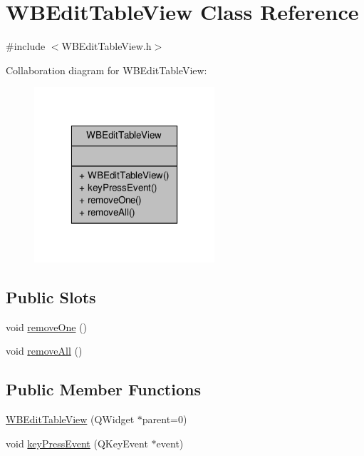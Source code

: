 \hypertarget{class_w_b_edit_table_view}{\section{W\-B\-Edit\-Table\-View Class Reference}
\label{d4/df9/class_w_b_edit_table_view}
}


{\ttfamily \#include $<$W\-B\-Edit\-Table\-View.\-h$>$}



Collaboration diagram for W\-B\-Edit\-Table\-View\-:
\nopagebreak
\begin{figure}[H]
\begin{center}
\leavevmode
\includegraphics[width=190pt]{de/d16/class_w_b_edit_table_view__coll__graph}
\end{center}
\end{figure}
\subsection*{Public Slots}
\begin{DoxyCompactItemize}
\item 
void \hyperlink{class_w_b_edit_table_view_aad3c7f889095383b0e38c550688b7221}{remove\-One} ()
\item 
void \hyperlink{class_w_b_edit_table_view_ab312519ca2faf4456999c496e7dbf63c}{remove\-All} ()
\end{DoxyCompactItemize}
\subsection*{Public Member Functions}
\begin{DoxyCompactItemize}
\item 
\hyperlink{class_w_b_edit_table_view_ab40e16c3d64fb3712ca28644eeeb95da}{W\-B\-Edit\-Table\-View} (Q\-Widget $\ast$parent=0)
\item 
void \hyperlink{class_w_b_edit_table_view_ad1f22df09c5846ec738a9e1a9367b561}{key\-Press\-Event} (Q\-Key\-Event $\ast$event)
\end{DoxyCompactItemize}


